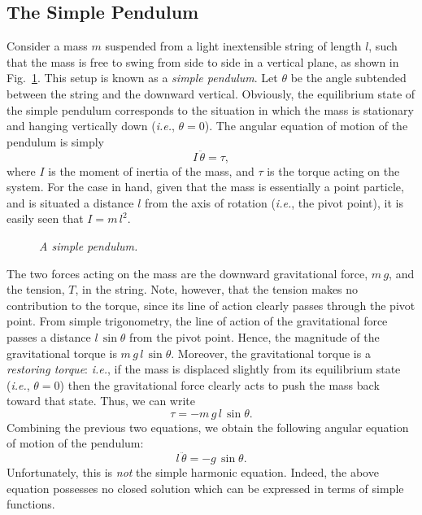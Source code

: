 \subsection{The Simple Pendulum}
Consider a mass $m$ suspended from a light inextensible string of length $l$, such that the
mass is free to swing from side to side in a vertical plane, as shown in Fig.~\ref{f98}.
This setup is known as a {\em simple pendulum}. 
 Let $\theta$ be the angle subtended between the string and
the downward vertical. Obviously, the equilibrium state of the simple pendulum corresponds to
the situation in which the mass is stationary and hanging vertically down ({\em i.e.}, $\theta=0$).
The angular equation of motion of the pendulum is simply
\begin{equation}
I\,\ddot{\theta} = \tau,
\end{equation}
where $I$ is the moment of inertia of the mass, and $\tau$ is the torque acting on the system. For the
case in hand, given that the mass is essentially a point particle, and is situated a distance $l$ from
the axis of rotation ({\em i.e.}, the pivot point), it is easily seen that $I=m\,l^2$. 

\begin{figure}
\epsfysize=3in
\centerline{}
\caption{\em A simple pendulum.}\label{f98}  
\end{figure}

The two forces acting on the mass are the downward gravitational force, $m \,g$, and the tension, $T$, in the string.
Note, however, that the tension makes no contribution to the torque, since its line of action clearly passes
through the pivot point. From simple trigonometry, 
the line of action of the gravitational force passes a distance $l\,\sin\theta$ from the
pivot point. Hence, the magnitude of the gravitational torque is $m\,g\,l\,\sin\theta$.
Moreover, the gravitational torque is  a {\em restoring torque}: {\em i.e.}, if the mass is
displaced slightly from its equilibrium state ({\em i.e.}, $\theta =0$) then the gravitational force  clearly acts
 to push the mass back toward that state. Thus, we can write
\begin{equation}
\tau = - m\,g\,l\,\sin\theta.
\end{equation}
Combining the previous two equations, we obtain the following  angular equation of motion of the pendulum:
\begin{equation}\label{epend}
l\,\ddot{\theta} = - g\,\sin\theta.
\end{equation}
Unfortunately, this is {\em not} the simple harmonic equation. Indeed, the above equation possesses no
closed solution which can be expressed in terms of simple functions. 

